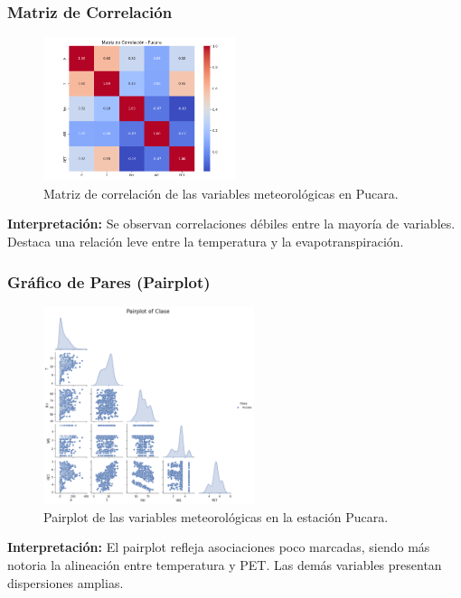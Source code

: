 \subsubsection*{Matriz de Correlación}
\begin{figure}[H]
\centering
\includegraphics[width=0.5\textwidth]{resultados/por_estacion_meteorologica/Pucara/matriz_correlacion.png}
\caption{Matriz de correlación de las variables meteorológicas en Pucara.}
\label{fig:pucara_corr}
\end{figure}
\textbf{Interpretación:} Se observan correlaciones débiles entre la mayoría de variables. Destaca una relación leve entre la temperatura y la evapotranspiración.

\subsubsection*{Gráfico de Pares (Pairplot)}
\begin{figure}[H]
\centering
\includegraphics[width=0.55\textwidth]{resultados/por_estacion_meteorologica/Pucara/pairplot.png}
\caption{Pairplot de las variables meteorológicas en la estación Pucara.}
\label{fig:pucara_pairplot}
\end{figure}
\textbf{Interpretación:} El pairplot refleja asociaciones poco marcadas, siendo más notoria la alineación entre temperatura y PET. Las demás variables presentan dispersiones amplias.


